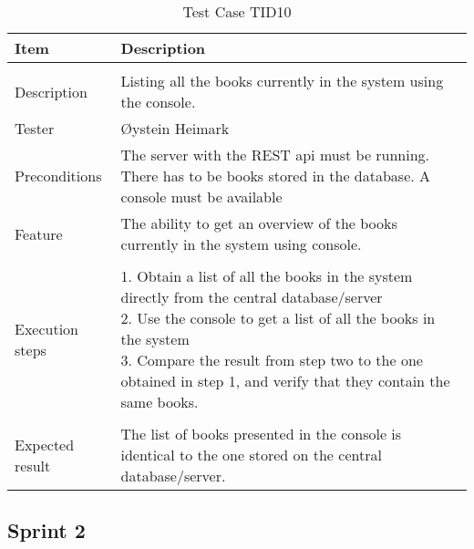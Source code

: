 \begin{table}
\caption{Test Case TID10}
\centering
\begin{tabular}{ l p{13cm} }
\hline 
 Item            & Description                                                              \\ 
\hline \\ [-2.0ex]
 Description     & Listing all the books currently in the system using the console. \\ 
 Tester          & Øystein Heimark                  \\ 
 Preconditions   & The server with the REST api must be running. There has to be books stored in the database.  A console must be available\\ 
 Feature         & The ability to get an overview of the books currently in the system using console.   \vspace{3pt}                     \\ 
\hline \\ [-1.5ex]
 Execution steps & \pbox{13cm}{1. Obtain a list of all the books in the system directly from the central database/server \\ 2. Use the console to get a list of all the books in the system \\ 3. Compare the result from step two to the one obtained in step 1, and verify that they contain the same books.} \vspace{3pt} \\
\hline \\ [-1.5ex]
 Expected result & The list of books presented in the console is identical to the one stored on the central database/server.          \\
\hline 
\end{tabular}
\label{table:testcasetid10}
\end{table}


\subsection{Sprint 2}


